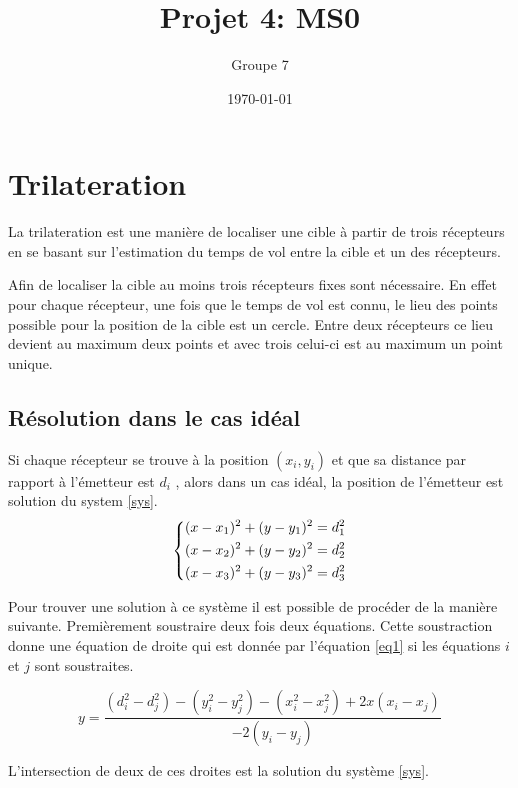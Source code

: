 \documentclass[10pt,a4paper]{article}
\begin{document}
\title{Projet 4: MS0}
\date\today
\author{Groupe 7}
\maketitle

\section{Trilateration}
	La trilateration est une manière de localiser une cible à partir de trois récepteurs en se basant sur l'estimation du temps de vol entre la cible et un des récepteurs. 
		
	Afin de localiser la cible au moins trois récepteurs fixes sont nécessaire. En effet pour chaque récepteur, une fois que le temps de vol est connu, le lieu des points possible pour la position de la cible est un cercle. Entre deux récepteurs ce lieu devient au maximum deux points et avec trois celui-ci est au maximum un point unique. 
		\subsection{Résolution dans le cas idéal}
		Si chaque récepteur se trouve à la position $(x_i , y_i)$ et que sa distance par rapport à l'émetteur est $d_i$ , alors dans un cas idéal, la position de l'émetteur est solution du system \ref{sys}.  
		\begin{equation}
		\begin{dcases}
			(x - x_1)^2 + (y-y_1)^2 = d_1^2 \\
			(x - x_2)^2 + (y-y_2)^2 = d_2^2 \\
			(x - x_3)^2 + (y-y_3)^2 = d_3^2 
		\end{dcases}
		\label{sys}
		\end{equation}
		
		Pour trouver une solution à ce système il est possible de procéder de la manière suivante. Premièrement soustraire deux fois deux équations. Cette soustraction donne une équation de droite qui est donnée par l'équation \ref{eq1} si les équations $i$ et $j$ sont soustraites.
		
		\begin{equation}
			\label{eq1}
			y = \frac{(d_i^2 - d_j^2) - (y_i^2 -y_j^2)-(x_i^2 - x_j^2) + 2x(x_i-x_j)}{-2(y_i-y_j)}
		\end{equation}
		
		L'intersection de deux de ces droites est la solution du système \ref{sys}. 
		
\end{document}
